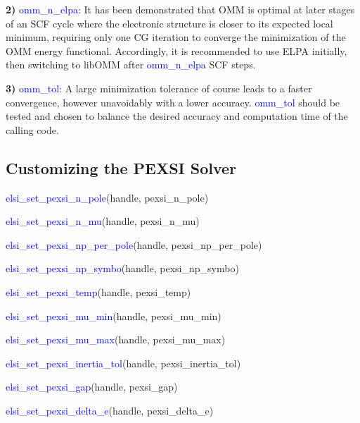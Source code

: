 \documentclass{report}
\begin{document}
\textbf{2)} \textcolor{blue}{omm\_n\_elpa}:  It has been demonstrated that OMM is optimal at later stages of an SCF cycle where the electronic structure is closer to its expected local minimum, requiring only one CG iteration to converge the minimization of the OMM energy functional.  Accordingly, it is recommended to use ELPA initially, then switching to libOMM after \textcolor{blue}{omm\_n\_elpa} SCF steps.

\textbf{3)} \textcolor{blue}{omm\_tol}:  A large minimization tolerance of course leads to a faster convergence, however unavoidably with a lower accuracy.  \textcolor{blue}{omm\_tol} should be tested and chosen to balance the desired accuracy and computation time of the calling code.

\subsection{Customizing the PEXSI Solver}
\label{subsec:setter_pexsi}
\begin{labeling}{\hspace{6cm}}
\item [\hspace{0.3cm} \textcolor{blue}{elsi\_set\_pexsi\_n\_pole}(handle, pexsi\_n\_pole)]
\item [\hspace{0.3cm} \textcolor{blue}{elsi\_set\_pexsi\_n\_mu}(handle, pexsi\_n\_mu)]
\item [\hspace{0.3cm} \textcolor{blue}{elsi\_set\_pexsi\_np\_per\_pole}(handle, pexsi\_np\_per\_pole)]
\item [\hspace{0.3cm} \textcolor{blue}{elsi\_set\_pexsi\_np\_symbo}(handle, pexsi\_np\_symbo)]
\item [\hspace{0.3cm} \textcolor{blue}{elsi\_set\_pexsi\_temp}(handle, pexsi\_temp)]
\item [\hspace{0.3cm} \textcolor{blue}{elsi\_set\_pexsi\_mu\_min}(handle, pexsi\_mu\_min)]
\item [\hspace{0.3cm} \textcolor{blue}{elsi\_set\_pexsi\_mu\_max}(handle, pexsi\_mu\_max)]
\item [\hspace{0.3cm} \textcolor{blue}{elsi\_set\_pexsi\_inertia\_tol}(handle, pexsi\_inertia\_tol)]
\item [\hspace{0.3cm} \textcolor{blue}{elsi\_set\_pexsi\_gap}(handle, pexsi\_gap)]
\item [\hspace{0.3cm} \textcolor{blue}{elsi\_set\_pexsi\_delta\_e}(handle, pexsi\_delta\_e)]
\end{labeling}
\end{document}
